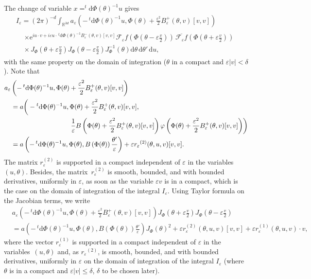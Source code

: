 \documentclass[10pt]{amsart}
\theoremstyle{definition}
\newcommand*\R{{\mathbb R}}
\newcommand*\eps{\varepsilon}
\numberwithin{equation}{section}
\newcommand{\ee}{{\mathrm e}}
\newcommand*{\dd}{\mathrm{d}}
\newcommand*{\du}{\dd u}
\newcommand*{\dtheta}{\dd \theta}
\newcommand*{\dPhi}{\dd \Phi} %
\begin{document}
The change of variable $x=^t \dPhi (\theta)^{-1} u$ gives
\begin{multline*}
I_\eps = (2\pi)^{-d} \int_{\R^{3d}} a_\eps\left(-\,^t \dPhi (\theta)^{-1} u,\Phi(\theta)+\frac{\eps^2}{2} B_\eps^+(\theta,v)[v,v]\right)
\\
\begin{aligned}
&\times {\ee}^{i u\cdot v +i\eps u\cdot \,^t \dPhi (\theta)^{-1} B_\eps^-(\theta,v)[v,v]} {\mathcal F}_\eps f\left(\Phi\left(\theta -\eps\frac{v}{2}\right)\right)
\,\overline{{\mathcal F}_\eps f}\left(\Phi\left(\theta +\eps\frac{v}{2}\right)\right) \\
&\times \,J_\Phi \left(\theta +\eps\frac{v}{2}\right)J_\Phi\left(\theta -\eps\frac{v}{2}\right)J_\Phi^{-1} \left(\theta \right) \dtheta\,\dtheta'\,\du,
\end{aligned}
\end{multline*}
with the same property on the domain of integration ($\theta$ in a compact and $\eps |v|<\delta$). Note that
\begin{align*}
&a_\eps\left(-\,^t \dPhi (\theta)^{-1} u,\Phi(\theta)+\frac{\eps^2}{2} B_\eps^+(\theta,v)[v,v]\right)\\
&\quad=a\bigg(-{}^t \dPhi (\theta)^{-1} u,\Phi(\theta)+\frac{\eps^2}{2} B_\eps^+(\theta,v)[v,v],\\
&\mkern 180mu\frac{1}{\eps} B\left(\Phi(\theta)+\frac{\eps^2}{2} B_\eps^+(\theta,v)[v,v]\right) \varphi\left(\Phi(\theta)+\frac{\eps^2}{2} B_\eps^+(\theta,v)[v,v]\right)\biggr) \\
&\quad=a\left(-\,^t \dPhi (\theta)^{-1} u,\Phi(\theta), B\left(\Phi(\theta)\right) \frac{\theta'}{\eps}\right) +\eps r_\eps{^{(2)}} (\theta,u,v)[v,v].
\end{align*}
The matrix $r_\eps^{(2)}$ is supported in a compact independent of $\eps$ in the variables $(u,\theta)$. Besides, the matrix~$r_\eps^{(2)}$ is smooth, bounded, and with bounded derivatives, uniformly in $\eps$, as soon as the variable $\eps v$ is in a compact, which is the case on the domain of integration of the integral $I_\eps$. Using Taylor formula on the Jacobian terms, we write
\begin{align*}
&a_\eps\left(-\,^t \dPhi (\theta)^{-1} u,\Phi(\theta)+\frac{\eps^2}{2} B_\eps^+(\theta,v)[v,v]\right)J_\Phi \left(\theta +\eps \frac{v}{2}\right)J_\Phi\left(\theta -\eps \frac{v}{2}\right) \\
&= a\left(-\,^t \dPhi (\theta)^{-1} u,\Phi(\theta), B\left(\Phi(\theta)\right) \frac{\theta'}{\eps}\right) J_\Phi(\theta)^2+\eps r_\eps^{(2)} (\theta,u,v)[v,v]+ \eps r_\eps^{(1)} (\theta,u,v)\cdot v,
\end{align*}
where the vector $ r_\eps^{(1)}$ is supported in a compact independent of $\eps$ in the variables~$(u,\theta)$ and, as $r_\eps{^{(2)}}$, is smooth, bounded, and with bounded derivatives, uniformly in $\eps$ on the domain of integration of the integral $I_\eps$ (where $\theta$ is in a compact and $\eps |v|\leq \delta$, $\delta$ to be chosen later).
\end{document}
